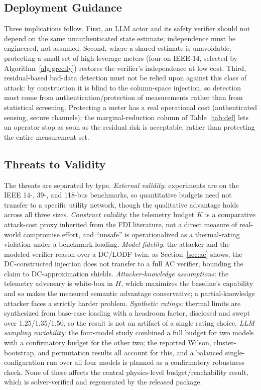 \documentclass{ieeeaccess}
\begin{document}
\subsection{Deployment Guidance}
Three implications follow. First, an LLM actor and its safety verifier should not depend on the same unauthenticated state estimate; independence must be engineered, not assumed. Second, where a shared estimate is unavoidable, protecting a small set of high-leverage meters (four on IEEE-14, selected by Algorithm~\ref{alg:greedy}) restores the verifier's independence at low cost. Third, residual-based bad-data detection must not be relied upon against this class of attack: by construction it is blind to the column-space injection, so detection must come from authentication/protection of measurements rather than from statistical screening. Protecting a meter has a real operational cost (authenticated sensing, secure channels); the marginal-reduction column of Table~\ref{tab:def} lets an operator stop as soon as the residual risk is acceptable, rather than protecting the entire measurement set.

\subsection{Threats to Validity}
The threats are separated by type. \emph{External validity}: experiments are on the IEEE 14-, 39-, and 118-bus benchmarks, so quantitative budgets need not transfer to a specific utility network, though the qualitative advantage holds across all three sizes. \emph{Construct validity}: the telemetry budget $K$ is a comparative attack-cost proxy inherited from the FDI literature, not a direct measure of real-world compromise effort, and ``unsafe'' is operationalized as a thermal-rating violation under a benchmark loading. \emph{Model fidelity}: the attacker and the modeled verifier reason over a DC/LODF twin; as Section~\ref{sec:ac} shows, the DC-constructed injection does not transfer to a full AC verifier, bounding the claim to DC-approximation shields. \emph{Attacker-knowledge assumptions}: the telemetry adversary is white-box in $H$, which maximizes the baseline's capability and so makes the measured semantic advantage conservative; a partial-knowledge attacker faces a strictly harder problem. \emph{Synthetic ratings}: thermal limits are synthesized from base-case loading with a headroom factor, disclosed and swept over 1.25/1.35/1.50, so the result is not an artifact of a single rating choice. \emph{LLM sampling variability}: the four-model study combined a full budget for two models with a confirmatory budget for the other two; the reported Wilson, cluster-bootstrap, and permutation results all account for this, and a balanced single-configuration run over all four models is planned as a confirmatory robustness check. None of these affects the central physics-level budget/reachability result, which is solver-verified and regenerated by the released package.
\end{document}
